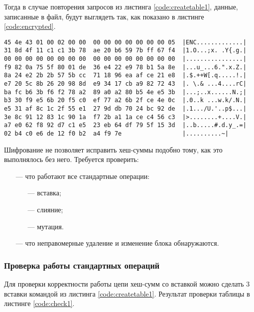 Тогда в случае повторения запросов из листинга \ref{code:createtable1}, данные, записанные в файл, будут выглядеть так, как показано в листинге \ref{code:encrypted}.

\pagebreak

\begin{lstlisting}[label=code:encrypted, caption={Данные при шифровании диска.}]
45 4e 43 01 00 02 00 00  00 00 00 00 00 00 00 05  |ENC.............|
31 8d 4f 11 c1 c1 3b 78  ae 20 b6 59 7b ff 67 f4  |1.O...;x. .Y{.g.|
00 00 00 00 00 00 00 00  00 00 00 00 00 00 00 00  |................|
f9 82 0a 75 5f 80 01 de  36 e4 22 e9 78 b1 5a 8e  |...u_...6.".x.Z.|
8a 24 e2 2b 2b 57 5b cc  71 18 96 ea af ce 21 e8  |.$.++W[.q.....!.|
e7 20 5c 8b 26 20 98 8d  e9 34 17 cb a9 82 72 43  |. \.& ...4....rC|
ba fc b6 3b f6 f2 78 a2  89 a0 a2 80 b5 4e e5 3b  |...;..x......N.;|
b3 30 f9 e5 6b 20 f5 c0  ef 77 a2 6b 2f ce 4e 0c  |.0..k ...w.k/.N.|
e5 31 af 8c 1c 2f 55 e1  27 9d db 70 24 bc 92 de  |.1.../U.'..p$...|
3e 8c 91 12 83 1c 90 1a  f7 2b a1 1a ce c4 56 c3  |>........+....V.|
a7 e0 62 f8 92 d7 c1 e5  23 eb 64 df 79 5f 15 3d  |..b.....#.d.y_.=|
02 b4 c0 e6 de 12 f0 b2  a4 f9 7e                 |..........~|
\end{lstlisting}

Шифрование не позволяет исправить хеш-суммы подобно тому, как это выполнялось без него. Требуется проверить:
\begin{itemize}
    \item [---] что работают все стандартные операции:
        \begin{itemize}
            \item [---] вставка;
            \item [---] слияние;
            \item [---] мутация.
        \end{itemize}
    \item [---] что неправомерные удаление и изменение блока обнаружаются.
\end{itemize}

\pagebreak

\subsubsection{Проверка работы стандартных операций}

Для проверки корректности работы цепи хеш-сумм со вставкой можно сделать 3 вставки командой из листинга \ref{code:createtable1}. Результат проверки таблицы в листинге \ref{code:check1}.

